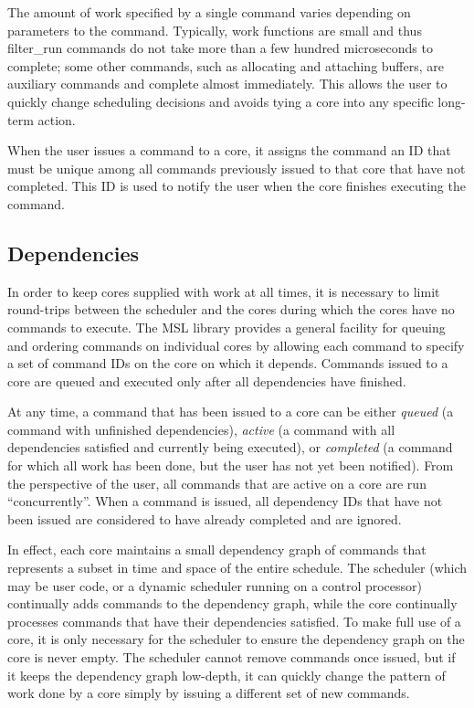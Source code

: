 The amount of work specified by a single command varies depending on
parameters to the command. Typically, work functions are small and thus \textsf{filter\_run} commands do
not take more than a few hundred microseconds to complete; some other
commands, such as allocating and attaching buffers, are auxiliary commands and complete almost immediately. This
allows the user to quickly change scheduling decisions and avoids
tying a core into any specific long-term action.

When the user issues a command to a core, it assigns the command an ID
that must be unique among all commands previously issued to that core
that have not completed. This ID is used to notify the user when the
core finishes executing the command.

\subsection{Dependencies}

In order to keep cores supplied with work at all times, it is
necessary to limit round-trips between the scheduler and the cores
during which the cores have no commands to execute. The MSL library
provides a general facility for queuing and ordering commands on
individual cores by allowing each command to specify a set of command
IDs on the core on which it depends. Commands issued to a core are
queued and executed only after all dependencies have finished.

At any time, a command that has been issued to a core can be either
\emph{queued} (a command with unfinished dependencies), \emph{active}
(a command with all dependencies satisfied and currently being
executed), or \emph{completed} (a command for which all work has been
done, but the user has not yet been notified). From the perspective of
the user, all commands that are active on a core are run
``concurrently''. When a command is issued, all dependency IDs that
have not been issued are considered to have already completed and are
ignored.

In effect, each core maintains a small dependency graph of commands
that represents a subset in time and space of the entire
schedule. The scheduler (which may be
user code, or a dynamic scheduler running on a control processor)
continually adds commands to the dependency graph, while the core
continually processes commands that have their dependencies
satisfied. To make full use of a core, it is only necessary for the
scheduler to ensure the dependency graph on the core is never
empty. The scheduler cannot remove commands once issued, but if it
keeps the dependency graph low-depth, it can quickly change the
pattern of work done by a core simply by issuing a different set of
new commands.

